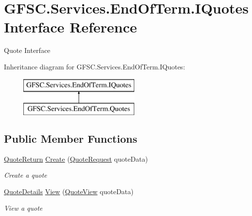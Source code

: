 \hypertarget{interface_g_f_s_c_1_1_services_1_1_end_of_term_1_1_i_quotes}{}\section{G\+F\+S\+C.\+Services.\+End\+Of\+Term.\+I\+Quotes Interface Reference}
\label{interface_g_f_s_c_1_1_services_1_1_end_of_term_1_1_i_quotes}


Quote Interface  


Inheritance diagram for G\+F\+S\+C.\+Services.\+End\+Of\+Term.\+I\+Quotes\+:\begin{figure}[H]
\begin{center}
\leavevmode
\includegraphics[height=2.000000cm]{interface_g_f_s_c_1_1_services_1_1_end_of_term_1_1_i_quotes}
\end{center}
\end{figure}
\subsection*{Public Member Functions}
\begin{DoxyCompactItemize}
\item 
\mbox{\hyperlink{class_g_f_s_c_1_1_services_1_1_end_of_term_1_1_quote_return}{Quote\+Return}} \mbox{\hyperlink{interface_g_f_s_c_1_1_services_1_1_end_of_term_1_1_i_quotes_a7290f204a4faa7f07a03b64d32a1617e}{Create}} (\mbox{\hyperlink{class_g_f_s_c_1_1_services_1_1_end_of_term_1_1_quote_request}{Quote\+Request}} quote\+Data)
\begin{DoxyCompactList}\small\item\em Create a quote \end{DoxyCompactList}\item 
\mbox{\hyperlink{class_g_f_s_c_1_1_services_1_1_end_of_term_1_1_quote_details}{Quote\+Details}} \mbox{\hyperlink{interface_g_f_s_c_1_1_services_1_1_end_of_term_1_1_i_quotes_a013eda014c2d0fef34e334f7c868d19c}{View}} (\mbox{\hyperlink{class_g_f_s_c_1_1_services_1_1_end_of_term_1_1_quote_view}{Quote\+View}} quote\+Data)
\begin{DoxyCompactList}\small\item\em View a quote \end{DoxyCompactList}\end{DoxyCompactItemize}


